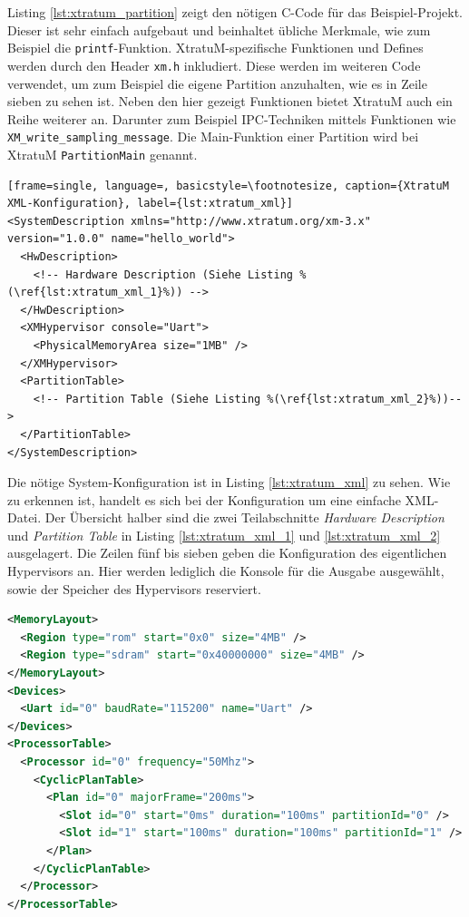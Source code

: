 \documentclass[
  a4paper,					    %
  twoside,
  DIV=calc,     				%
  bibliography=totoc,
  cleardoublepage=empty,
  ngerman,     					%
  final       					%
]{scrbook}
\begin{document}
Listing \ref{lst:xtratum_partition} zeigt den nötigen C-Code für das Beispiel-Projekt. Dieser ist sehr einfach aufgebaut und beinhaltet übliche Merkmale, wie zum Beispiel die \texttt{printf}-Funktion. XtratuM-spezifische Funktionen und Defines werden durch den Header \texttt{xm.h} inkludiert. Diese werden im weiteren Code verwendet, um zum Beispiel die eigene Partition anzuhalten, wie es in Zeile sieben zu sehen ist. Neben den hier gezeigt Funktionen bietet XtratuM auch ein Reihe weiterer an. Darunter zum Beispiel IPC-Techniken mittels Funktionen wie \texttt{XM\_write\_sampling\_message}. Die Main-Funktion einer Partition wird bei XtratuM \texttt{PartitionMain} genannt.

\begin{lstlisting}[frame=single, language=, basicstyle=\footnotesize, caption={XtratuM XML-Konfiguration}, label={lst:xtratum_xml}]
<SystemDescription xmlns="http://www.xtratum.org/xm-3.x" version="1.0.0" name="hello_world">
  <HwDescription>
    <!-- Hardware Description (Siehe Listing %(\ref{lst:xtratum_xml_1}%)) -->
  </HwDescription>
  <XMHypervisor console="Uart">
    <PhysicalMemoryArea size="1MB" />
  </XMHypervisor>
  <PartitionTable>
    <!-- Partition Table (Siehe Listing %(\ref{lst:xtratum_xml_2}%))-->
  </PartitionTable>
</SystemDescription>
\end{lstlisting}

Die nötige System-Konfiguration ist in Listing \ref{lst:xtratum_xml} zu sehen. Wie zu erkennen ist, handelt es sich bei der Konfiguration um eine einfache XML-Datei. Der Übersicht halber sind die zwei Teilabschnitte \emph{Hardware Description} und \emph{Partition Table} in Listing \ref{lst:xtratum_xml_1} und \ref{lst:xtratum_xml_2} ausgelagert. Die Zeilen fünf bis sieben geben die Konfiguration des eigentlichen Hypervisors an. Hier werden lediglich die Konsole für die Ausgabe ausgewählt, sowie der Speicher des Hypervisors reserviert.

\begin{lstlisting}[frame=single, language=XML, basicstyle=\footnotesize, caption={XtratuM Hardware Description}, label={lst:xtratum_xml_1}]
<MemoryLayout>
  <Region type="rom" start="0x0" size="4MB" />
  <Region type="sdram" start="0x40000000" size="4MB" />
</MemoryLayout>
<Devices>
  <Uart id="0" baudRate="115200" name="Uart" />
</Devices>
<ProcessorTable>
  <Processor id="0" frequency="50Mhz">
    <CyclicPlanTable>
      <Plan id="0" majorFrame="200ms">
        <Slot id="0" start="0ms" duration="100ms" partitionId="0" />
        <Slot id="1" start="100ms" duration="100ms" partitionId="1" />
      </Plan>
    </CyclicPlanTable>
  </Processor>
</ProcessorTable>
\end{lstlisting}
\end{document}
